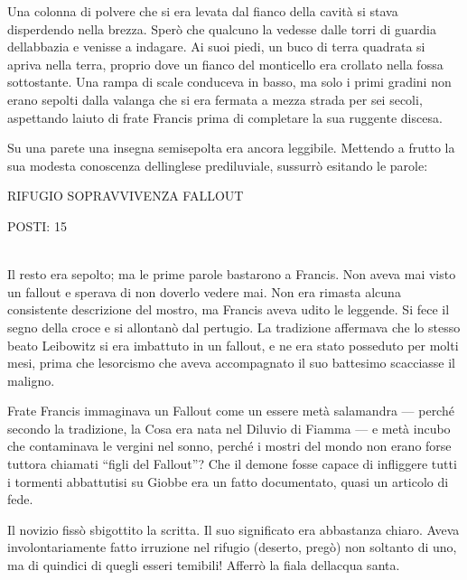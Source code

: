 Una colonna di polvere che si era levata dal fianco della cavità si
stava disperdendo nella brezza. Sperò che qualcuno la vedesse dalle
torri di guardia dell\textquotesingle abbazia e venisse a indagare. Ai
suoi piedi, un buco di terra quadrata si apriva nella terra, proprio
dove un fianco del monticello era crollato nella fossa sottostante. Una
rampa di scale conduceva in basso, ma solo i primi gradini non erano
sepolti dalla valanga che si era fermata a mezza strada per sei secoli,
aspettando l\textquotesingle aiuto di frate Francis prima di completare
la sua ruggente discesa.

Su una parete una insegna semisepolta era ancora leggibile. Mettendo a
frutto la sua modesta conoscenza dell\textquotesingle inglese
prediluviale, sussurrò esitando le parole:
\begin{center}
	{\Large RIFUGIO SOPRAVVIVENZA FALLOUT }
\end{center}

\begin{center}
	{\large POSTI: 15}
\end{center}

\begin{center}
\end{center}
\leavevmode\\
Il resto era sepolto; ma le prime parole bastarono a Francis. Non aveva
mai visto un fallout e sperava di non doverlo vedere mai. Non era
rimasta alcuna consistente descrizione del mostro, ma Francis aveva
udito le leggende. Si fece il segno della croce e si allontanò dal
pertugio. La tradizione affermava che lo stesso beato Leibowitz si era
imbattuto in un fallout, e ne era stato posseduto per molti mesi, prima
che l\textquotesingle esorcismo che aveva accompagnato il suo battesimo
scacciasse il maligno.

Frate Francis immaginava un Fallout come un essere metà salamandra ---
perché secondo la tradizione, la Cosa era nata nel Diluvio di Fiamma ---
e metà incubo che contaminava le vergini nel sonno, perché i mostri del
mondo non erano forse tuttora chiamati ``figli del Fallout''? Che il
demone fosse capace di infliggere tutti i tormenti abbattutisi su Giobbe
era un fatto documentato, quasi un articolo di fede.

Il novizio fissò sbigottito la scritta. Il suo significato era
abbastanza chiaro. Aveva involontariamente fatto irruzione nel rifugio
(deserto, pregò) non soltanto di uno, ma di quindici di quegli esseri
temibili! Afferrò la fiala dell\textquotesingle acqua santa.

\newpage